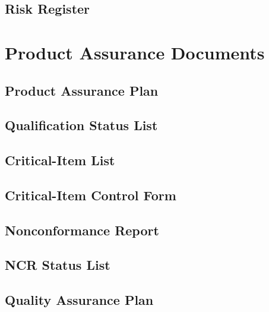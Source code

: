 \subsection{Risk Register}
\label{sec:Risk Register}


\clearpage
\section{Product Assurance Documents}


\subsection{Product Assurance Plan}
\label{sec:Product Assurance Plan}


\subsection{Qualification Status List}
\label{sec:Qualification Status List}


\subsection{Critical-Item List}
\label{sec:Critical-Item List}


\subsection{Critical-Item Control Form}
\label{sec:Critical-Item Control Form}


\subsection{Nonconformance Report}
\label{sec:Nonconformance Report}


\subsection{NCR Status List}
\label{sec:NCR Status List}


\subsection{Quality Assurance Plan}
\label{sec:Quality Assurance Plan}


